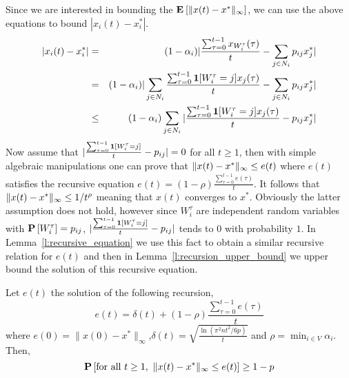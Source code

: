 Since we are interested in bounding the $\bm{\mathrm{E}}_{} \left[ \| x(t)-x^* \|_{\infty} \right]$, we
can use the above equations to bound $|x_i(t)-x_i^*|$.
\begin{eqnarray*}
 |x_i(t)-x_i^*|
 &=& (1-\alpha_i)|\frac{\sum_{\tau=0}^{t-1} x_{W_i^\tau}(\tau)}{t}
 - \sum_{j \in N_i} p_{ij}x_j^*|\\
 &=& (1-\alpha_i)|\sum_{j \in N_i}\frac{\sum_{\tau=0}^{t-1} \bm{1}{\left[W_i^\tau=j\right]}x_j(\tau)}{t}-\sum_{j \in N_i} p_{ij}x_j^*|\\
 &\leq& (1-\alpha_i)\sum_{j \in N_i}|\frac{\sum_{\tau=0}^{t-1} \bm{1}{\left[W_i^\tau=j\right]}x_j(\tau)}{t}- p_{ij}x_j^*|
\end{eqnarray*}
Now assume that $|\frac{\sum_{\tau=0}^{t-1} \bm{1}{\left[W_i^{\tau}=j\right]}}{t}- p_{ij}| = 0$ 
for all $t\geq 1$, then with simple algebraic manipulations 
one can prove that $\| x(t)-x^* \|_{\infty} \leq e(t)$ where $e(t)$ 
satisfies the recursive equation $e(t) = (1-\rho)\frac{\sum_{\tau=0}^{t-1}e(\tau)}{t}$.
It follows that $\| x(t)-x^* \|_{\infty} \leq 1/t^\rho$ 
meaning that $x(t)$ converges to $x^*$.
Obviously the latter assumption does not hold,
however since $W_i^{\tau}$ are independent random variables
with $\bm{\mathrm{P}}\left[W_i^\tau\right]=p_{ij}$,
$|\frac{\sum_{\tau=0}^{t-1} \bm{1}{\left[W_i^{\tau}=j\right]}}{t} - p_{ij}|$ 
tends to $0$ with probability $1$. 
In Lemma~\ref{l:recursive_equation} we use this fact
to obtain a similar recursive relation for $e(t)$ 
and then in Lemma~\ref{l:recursion_upper_bound}
we upper bound the solution of this recursive equation.
\begin{lemma}\label{l:recursive_equation}
Let $e(t)$ the solution of the following recursion,
\[e(t) =\delta(t) + (1-\rho)\frac{\sum_{\tau=0}^{t-1}e(\tau)}{t}\]
where $e(0)=\|x(0) - x^*\|_{\infty}$,\(\delta(t) = \sqrt{\frac{\ln(\pi^2n t^2/6p)}{t}}\)
and $\rho = \min_{i \in V}\alpha_i$. Then,
\[\bm{\mathrm{P}}\left[\text{for all }t \geq 1, ~\| x(t)-x^* \|_{\infty}\leq e(t)\right] \geq 1-p\]
\end{lemma}
